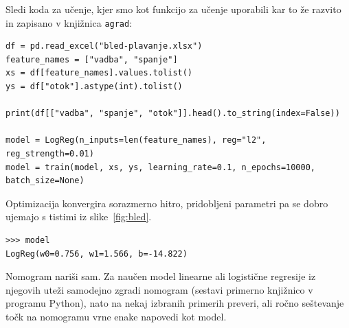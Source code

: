 Sledi koda za učenje, kjer smo kot funkcijo za učenje uporabili kar to že razvito in zapisano v knjižnica \texttt{agrad}:

%
\vspace*{3mm}
\begin{lstlisting}
df = pd.read_excel("bled-plavanje.xlsx")
feature_names = ["vadba", "spanje"]
xs = df[feature_names].values.tolist()
ys = df["otok"].astype(int).tolist()

print(df[["vadba", "spanje", "otok"]].head().to_string(index=False))

model = LogReg(n_inputs=len(feature_names), reg="l2", reg_strength=0.01)
model = train(model, xs, ys, learning_rate=0.1, n_epochs=10000, batch_size=None)
\end{lstlisting}

Optimizacija konvergira sorazmerno hitro, pridobljeni parametri pa se dobro ujemajo s tistimi iz slike~\ref{fig:bled}.

\vspace*{3mm}
\begin{lstlisting}
>>> model
LogReg(w0=0.756, w1=1.566, b=-14.822)
\end{lstlisting}

\begin{exercise}{Nomogram nariši sam.}
Za naučen model linearne ali logistične regresije iz njegovih uteži samodejno zgradi nomogram (sestavi primerno knjižnico v programu Python), nato na nekaj izbranih primerih preveri, ali ročno seštevanje točk na nomogramu vrne enake napovedi kot model.
\end{exercise}



